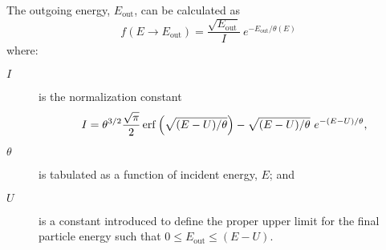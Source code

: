 The outgoing energy, $E_{\mathrm{out}}$, can be calculated as
\begin{equation}
  f(E\rightarrow E_{\mathrm{out}}) = \frac{\sqrt{E_{\mathrm{out}}}}{I}\ e^{-E_{\mathrm{out}}/\theta(E)}
  \label{eq:LAW7f}
\end{equation}
where:
\begin{description}
  \item[$I$] is the normalization constant
    \begin{equation}
      I = \theta^{{3/2}} \frac{\sqrt{\pi}}{2} \operatorname{erf}\left( \sqrt{(E-U)/\theta} \right) - \sqrt{(E-U)/\theta}\ e^{-(E-U)/\theta},
      \label{eq:LAW7I}
    \end{equation}
  \item[$\theta$] is tabulated as a function of incident energy, $E$; and
  \item[$U$] is a constant introduced to define the proper upper limit for the final particle energy such that $0\leq E_{\mathrm{out}} \leq (E-U)$.
\end{description}

